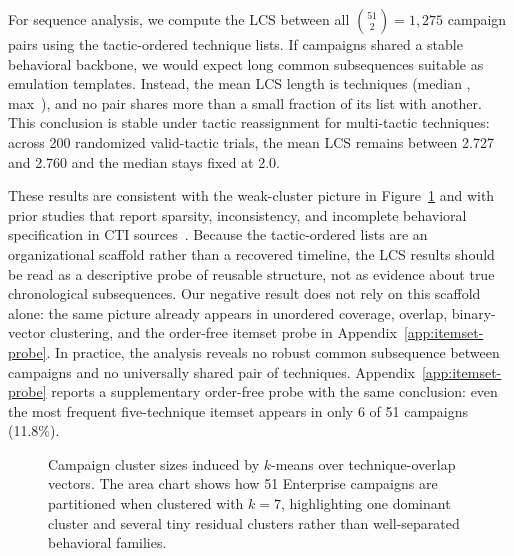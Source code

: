 \documentclass[sigconf]{acmart}
\begin{document}
For sequence analysis, we compute the LCS between all $\binom{51}{2} = 1{,}275$ campaign pairs using the tactic-ordered technique lists. If campaigns shared a stable behavioral backbone, we would expect long common subsequences suitable as emulation templates. Instead, the mean LCS length is \lcsLengthMean{} techniques (median \lcsLengthMedian{}, max~\lcsLengthMax{}), and no pair shares more than a small fraction of its list with another. This conclusion is stable under tactic reassignment for multi-tactic techniques: across 200 randomized valid-tactic trials, the mean LCS remains between 2.727 and 2.760 and the median stays fixed at 2.0.

These results are consistent with the weak-cluster picture in Figure~\ref{fig:ccluster} and with prior studies that report sparsity, inconsistency, and incomplete behavioral specification in CTI sources~\cite{jin2024sharing,savat2021extractor,10117505}. Because the tactic-ordered lists are an organizational scaffold rather than a recovered timeline, the LCS results should be read as a descriptive probe of reusable structure, not as evidence about true chronological subsequences. Our negative result does not rely on this scaffold alone: the same picture already appears in unordered coverage, overlap, binary-vector clustering, and the order-free itemset probe in Appendix~\ref{app:itemset-probe}. In practice, the analysis reveals no robust common subsequence between campaigns and no universally shared pair of techniques.
Appendix~\ref{app:itemset-probe} reports a supplementary order-free probe with the same conclusion: even the most frequent five-technique itemset appears in only 6 of 51 campaigns (11.8\%).

\begin{figure}[htpb]
\centering
\resizebox{\columnwidth}{!}{}
\caption{Campaign cluster sizes induced by $k$-means over technique-overlap vectors. The area chart shows how 51 Enterprise campaigns are partitioned when clustered with $k=7$, highlighting one dominant cluster and several tiny residual clusters rather than well-separated behavioral families.}
\label{fig:ccluster}
\end{figure}
\end{document}
